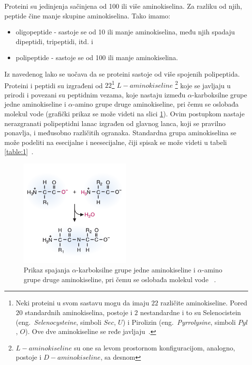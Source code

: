 Proteini su jedinjenja sačinjena od 100 ili više aminokiselina. Za razliku od njih, peptide čine manje skupine aminokiselina. Tako imamo:
\begin{itemize}
\item oligopeptide - sastoje se od 10 ili manje aminokiselina, među njih spadaju dipeptidi, tripeptidi, itd. i 
\item polipeptide - sastoje se od 100 ili manje aminokiselina.
\end{itemize}
Iz navedenog lako se uočava da se proteini sastoje od više spojenih polipeptida.
Proteini i peptidi su izgrađeni od $22$\footnote{Neki proteini u svom sastavu mogu da imaju $22$ različite aminokiseline. Pored $20$ standardnih aminokiselina, postoje i $2$ nestandardne i to su Selenocistein (eng.~{\em Selenocysteine}, simboli $Sec$, $U$) i Pirolizin (eng.~{\em Pyrrolysine},
simboli $Pyl$, $O$). Ove dve aminokiseline se ređe javljaju~\cite{MarijaJ}.} $L-aminokiseline$ \footnote{$L-aminokiseline$ su one sa levom prostornom konfiguracijom, analogno, postoje i $D-aminokiseline$, sa desnom} koje se javljaju u prirodi i povezani su peptidnim vezama, koje nastaju između $\alpha$-karboksilne grupe jedne aminokiseline i $\alpha$-amino grupe druge aminokiseline, pri čemu se oslobađa molekul vode (grafički prikaz se može videti na slici \ref{fig:peptidebonds}). Ovim postupkom nastaje nerazgranati polipeptidni lanac izgrađen od glavnog lanca, koji se pravilno ponavlja, i međusobno različitih ogranaka. Standardna grupa aminokiselina se može podeliti na esecijalne i
neesecijalne, čiji spisak se može videti u tabeli \ref{table:1}~\cite{MarijaJ,biopathways}.\\ 

\begin{figure}[h]
	\centering
    \includegraphics[width=0.5\textwidth]{Figures/BO/peptide_bonds.png}
    \caption{Prikaz spajanja $\alpha$-karboksilne grupe jedne aminokiseline i $\alpha$-amino grupe druge aminokiseline, pri čemu se oslobađa molekul vode ~\cite{bmbg}.}
    \label{fig:peptidebonds}
\end{figure}

